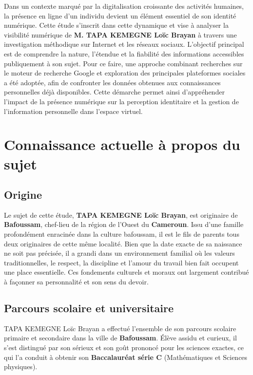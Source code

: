 \documentclass[12pt, a4em]{article}
\begin{document}
	Dans un contexte marqué par la digitalisation croissante des activités humaines, la présence en ligne d’un individu devient un élément essentiel de son identité numérique. Cette étude s’inscrit dans cette dynamique et vise à analyser la visibilité numérique de \textbf{M. TAPA KEMEGNE Loïc Brayan} à travers une investigation méthodique sur Internet et les réseaux sociaux. L’objectif principal est de comprendre la nature, l’étendue et la fiabilité des informations accessibles publiquement à son sujet. Pour ce faire, une approche combinant recherches sur le moteur de recherche Google et exploration des principales plateformes sociales a été adoptée, afin de confronter les données obtenues aux connaissances personnelles déjà disponibles. Cette démarche permet ainsi d’appréhender l’impact de la présence numérique sur la perception identitaire et la gestion de l’information personnelle dans l’espace virtuel.
	
	\pagebreak
	\section{Connaissance actuelle à propos du sujet}
	
	\subsection{Origine}
	
	Le sujet de cette étude, \textbf{TAPA KEMEGNE Loïc Brayan}, est originaire de \textbf{Bafoussam}, chef-lieu de la région de l’Ouest du \textbf{Cameroun}. Issu d’une famille profondément enracinée dans la culture bafoussam, il est le fils de parents tous deux originaires de cette même localité. 
	Bien que la date exacte de sa naissance ne soit pas précisée, il a grandi dans un environnement familial où les valeurs traditionnelles, le respect, la discipline et l’amour du travail bien fait occupent une place essentielle. 
	Ces fondements culturels et moraux ont largement contribué à façonner sa personnalité et son sens du devoir.
	
	\subsection{Parcours scolaire et universitaire}
	
	TAPA KEMEGNE Loïc Brayan a effectué l’ensemble de son parcours scolaire primaire et secondaire dans la ville de \textbf{Bafoussam}. 
	Élève assidu et curieux, il s’est distingué par son sérieux et son goût prononcé pour les sciences exactes, ce qui l’a conduit à obtenir son \textbf{Baccalauréat série C} (Mathématiques et Sciences physiques).
	
\end{document}
